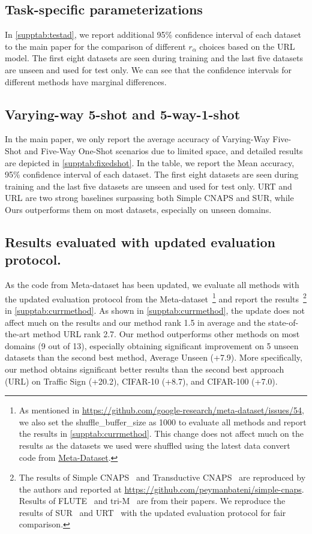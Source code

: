 \subsection{Task-specific parameterizations}

In \cref{supptab:testad}, we report additional 95\% confidence interval of each dataset to the main paper for the comparison of different $r_{\alpha}$ choices based on the URL model. The first eight datasets are seen during training and the last five datasets are unseen and used for test only. We can see that the confidence intervals for different methods have marginal differences.

\subsection{Varying-way 5-shot and 5-way-1-shot}

In the main paper, we only report the average accuracy of Varying-Way Five-Shot and Five-Way One-Shot scenarios due to limited space, and detailed results are depicted in \cref{supptab:fixedshot}. In the table, we report the Mean accuracy, 95\% confidence interval of each dataset. The first eight datasets are seen during training and the last five datasets are unseen and used for test only. URT and URL are two strong baselines surpassing both Simple CNAPS and SUR, while Ours outperforms them on most datasets, especially on unseen domains.

\subsection{Results evaluated with updated evaluation protocol.}
As the code from Meta-dataset has been updated, we evaluate all methods with the updated evaluation protocol from the Meta-dataset~\footnote{As mentioned in \url{https://github.com/google-research/meta-dataset/issues/54}, we also set the shuffle\_buffer\_size as 1000 to evaluate all methods and report the results in \cref{supptab:currmethod}. This change does not affect much on the results as the datasets we used were shuffled using the latest data convert code from \href{https://github.com/google-research/meta-dataset}{Meta-Dataset}.} and report the results~\footnote{The results of Simple CNAPS~\cite{bateni2020improved} and Transductive CNAPS~\cite{bateni2020enhancing} are reproduced by the authors and reported at \url{https://github.com/peymanbateni/simple-cnaps}. Results of FLUTE~\cite{triantafillou2021flute} and tri-M~\cite{liu2021multi} are from their papers. We reproduce the results of SUR~\cite{dvornik2020selecting} and URT~\cite{liu2020universal} with the updated evaluation protocol for fair comparison.} in \cref{supptab:currmethod}. As shown in \cref{supptab:currmethod}, the update does not affect much on the results and our method rank 1.5 in average and the state-of-the-art method URL rank 2.7. Our method outperforms other methods on most domains (9 out of 13), especially obtaining significant improvement on 5 unseen datasets than the second best method, \ie Average Unseen (+7.9). More specifically, our method obtains significant better results than the second best approach (URL) on Traffic Sign (+20.2), CIFAR-10 (+8.7), and CIFAR-100 (+7.0).


